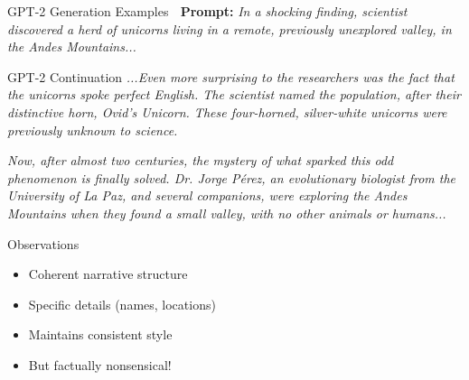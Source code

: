 \documentclass[aspectratio=169]{beamer}
\begin{document}
\begin{frame}{GPT-2 Generation Examples 💬}
\textbf{Prompt:} \textit{In a shocking finding, scientist discovered a herd of unicorns living in a remote, previously unexplored valley, in the Andes Mountains...}

\vspace{0.5em}

\begin{block}{GPT-2 Continuation}
\small
\textit{...Even more surprising to the researchers was the fact that the unicorns spoke perfect English. The scientist named the population, after their distinctive horn, Ovid's Unicorn. These four-horned, silver-white unicorns were previously unknown to science.}

\textit{Now, after almost two centuries, the mystery of what sparked this odd phenomenon is finally solved. Dr. Jorge Pérez, an evolutionary biologist from the University of La Paz, and several companions, were exploring the Andes Mountains when they found a small valley, with no other animals or humans...}
\end{block}

\vspace{0.5em}

\begin{alertblock}{Observations}
\begin{itemize}
    \item Coherent narrative structure
    \item Specific details (names, locations)
    \item Maintains consistent style
    \item \alert{But factually nonsensical!}
\end{itemize}
\end{alertblock}
\end{frame}
\end{document}
